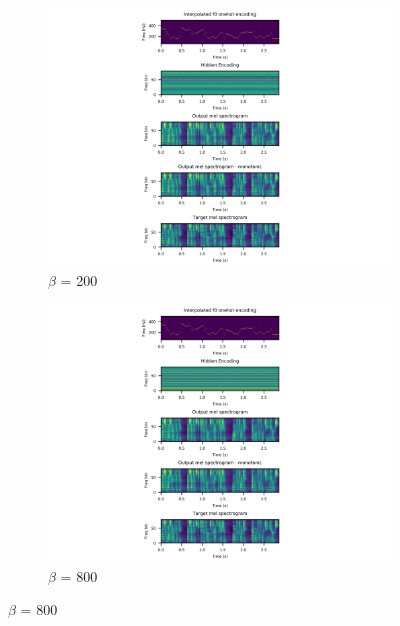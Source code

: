 \documentclass[10pt]{beamer}
\begin{document}
\begin{frame}[plain]
    \begin{figure}[h]
  \begin{subfigure}[b]{0.45\textwidth}
    \includegraphics[width=\textwidth,trim={3.8cm 0cm 4.8cm 5cm},clip]{figures/beta-100-spects_step-12750-0y0939.png}
    \caption{$\beta$ = 200}
    \label{fig:1beetbig}
  \end{subfigure}
  \begin{subfigure}[b]{0.45\textwidth}
    \includegraphics[width=\textwidth,trim={3.8cm 0cm 4.8cm 5cm},clip]{figures/beta-800-spects_step-12900-0y1095.png}
    \caption{$\beta$ = 800}
    \label{fig:2big}
  \end{subfigure}
\end{figure}

\end{frame}
\end{document}
